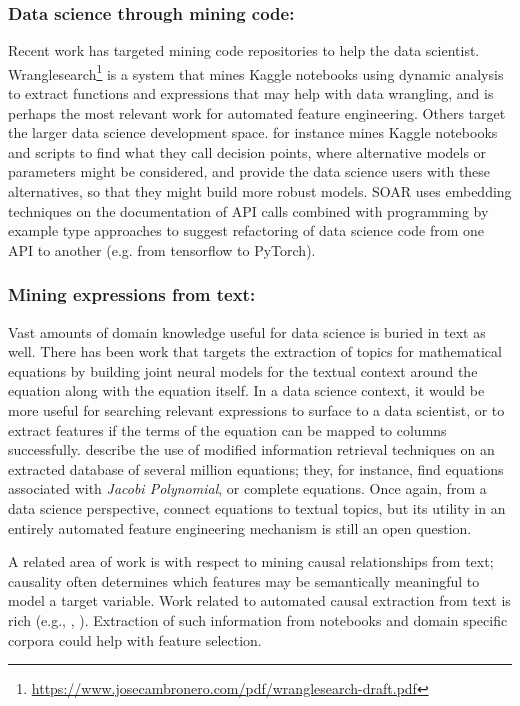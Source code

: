 \documentclass[sigconf]{acmart}
\begin{document}
\subsubsection{Data science through mining code:}
\label{code_section}
Recent work has targeted mining code repositories to help the data scientist.  Wranglesearch\footnote{\url{https://www.josecambronero.com/pdf/wranglesearch-draft.pdf}} is a system that mines Kaggle notebooks using dynamic analysis to extract functions and expressions that may help with data wrangling, and is perhaps the most relevant work for automated feature engineering.  Others target the larger data science development space.  \cite{10.1145/3447548.3467455} for instance mines Kaggle notebooks and scripts to find what they call decision points, where alternative models or parameters might be considered, and provide the data science users with these alternatives, so that they might build more robust models.  SOAR \cite{9402016} uses embedding techniques on the documentation of API calls combined with programming by example type approaches to suggest refactoring of data science code from one API to another (e.g. from tensorflow to PyTorch).


\subsubsection{Mining expressions from text:}
\label{nlp_expression_section}
Vast amounts of domain knowledge useful for data science is buried in text as well.  There has been work that targets the extraction of topics for mathematical equations \cite{Yasunaga_Lafferty_2019} by building joint neural models for the textual context around the equation along with the equation itself.  In a data science context, it would be more useful for searching relevant expressions to surface to a data scientist, or to extract features if the terms of the equation can be mapped to columns successfully.  \cite{10.1145/3366423.3380218} describe the use of modified information retrieval techniques on an extracted database of several million equations; they, for instance, find equations associated with {\em Jacobi Polynomial}, or complete equations.  Once again, from a data science perspective, \cite{10.1145/3366423.3380218} connect equations to textual topics, but its utility in an entirely automated feature engineering mechanism is still an open question.

A related area of work is with respect to mining causal relationships from text; causality often determines which features may be semantically meaningful to model a target variable.  Work related to automated causal extraction from text is rich (e.g., \cite{LI2019512}, \cite{hassanzadeh2019answering}). Extraction of such information from notebooks and domain specific corpora could help with feature selection.
\end{document}
